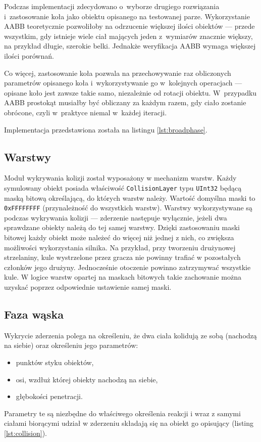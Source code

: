 Podczas implementacji zdecydowano o~wyborze drugiego rozwiązania i~zastosowanie koła jako obiektu opisanego na testowanej parze. Wykorzystanie AABB teoretycznie pozwoliłoby na odrzucenie większej ilości obiektów --- przede wszystkim, gdy istnieje wiele ciał mających jeden z~wymiarów znacznie większy, na przykład długie, szerokie belki. Jednakże weryfikacja AABB wymaga większej ilości porównań. 

Co więcej, zastosowanie koła pozwala na przechowywanie raz obliczonych parametrów opisanego koła i~wykorzystywanie go w~kolejnych operacjach --- opisane koło jest zawsze takie samo, niezależnie od rotacji obiektu. W~przypadku AABB prostokąt musiałby być obliczany za każdym razem, gdy ciało zostanie obrócone, czyli w~praktyce niemal w~każdej iteracji. 

Implementacja przedstawiona została na listingu \ref{lst:broadphase}.



\subsection{Warstwy}
Moduł wykrywania kolizji został wyposażony w mechanizm warstw. Każdy symulowany obiekt posiada właściwość  \verb|CollisionLayer| typu \verb|UInt32| będącą maską bitową określającą, do których warstw należy. Wartość domyślna maski to \verb|0xFFFFFFFF| (przynależność do wszystkich warstw). Warstwy wykorzystywane są podczas wykrywania kolizji --- zderzenie następuje wyłącznie, jeżeli dwa sprawdzane obiekty należą do tej samej warstwy. Dzięki zastosowaniu maski bitowej każdy obiekt może należeć do więcej niż jednej z nich, co zwiększa możliwości wykorzystania silnika. Na przykład, przy tworzeniu drużynowej strzelaniny, kule wystrzelone przez gracza nie powinny trafiać w pozostałych członków jego drużyny. Jednocześnie otoczenie powinno zatrzymywać wszystkie kule. W logice warstw opartej na maskach bitowych takie zachowanie można uzyskać poprzez odpowiednie ustawienie samej maski.
\subsection{Faza wąska}
Wykrycie zderzenia polega na określeniu, że dwa ciała kolidują ze sobą (nachodzą na siebie) oraz określeniu jego parametrów:
\begin{itemize}
	\item punktów styku obiektów,
	\item osi, wzdłuż której obiekty nachodzą na siebie,
	\item głębokości penetracji.
\end{itemize}
Parametry te są niezbędne do właściwego określenia reakcji i wraz z samymi ciałami biorącymi udział w zderzeniu składają się na obiekt go opisujący (listing \ref{lst:collision}).

